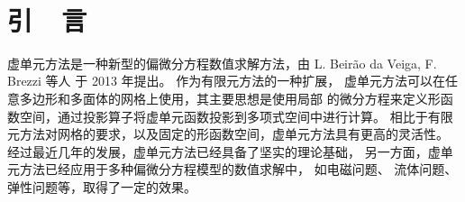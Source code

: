 ﻿﻿\chapter{引~~言}\label{chap:introduction}
虚单元方法是一种新型的偏微分方程数值求解方法，由 
L. Beir\~ao da Veiga, F. Brezzi
等人\cite{BeiraoBrezziCangianiManziniEtAl2013} 于 2013 年提出。
作为有限元方法的一种扩展，
虚单元方法可以在任意多边形和多面体的网格上使用，其主要思想是使用局部
的微分方程来定义形函数空间，通过投影算子将虚单元函数投影到多项式空间中进行计算。
相比于有限元方法对网格的要求，以及固定的形函数空间，虚单元方法具有更高的灵活性。
经过最近几年的发展，虚单元方法已经具备了坚实的理论基础，
另一方面，虚单元方法已经应用于多种偏微分方程模型的数值求解中，
如电磁问题\cite{2016VeigaBrezziMarini, da2022virtual, 2021CaoChenGuo}、
流体问题\cite{da2017divergence, 2021WeiHuangLi, da2018virtual, beirao2020stokes, zhao2019divergence}、
弹性问题\cite{CHI2017148, GAIN2014132, zhang2019nonconforming}等，取得了一定的效果。

